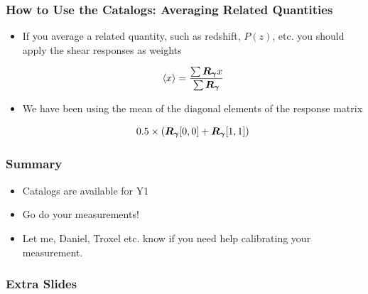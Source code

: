 \documentclass{beamer}
\newcommand{\mcalRg}{\mbox{\boldmath $R_\gamma$}}
\begin{document}
\frame
{
    \frametitle{How to Use the Catalogs: Averaging Related Quantities}
 
    \begin{itemize}

        \item If you average a related quantity, such as redshift, $P(z)$,
            etc. you should apply the shear responses as weights

            {\color{gold}
                \begin{align}
                    \langle x \rangle = \frac{\sum \mcalRg x}{\sum \mcalRg}
                \end{align}
            }

        \item We have been using the mean of the diagonal elements of the
            response matrix

            {\color{gold}
                \begin{align}
                    0.5 \times ( \mcalRg[0,0] + \mcalRg[1,1] )
                \end{align}
            }
    \end{itemize}
}


\frame
{
    \frametitle{Summary}
 
    \begin{itemize}

        \item Catalogs are available for Y1

        \item Go do your measurements!

        \item Let me, Daniel, Troxel etc. know if you need help calibrating
            your measurement.


    \end{itemize}
}







\frame
{
    \frametitle{Extra Slides}
}
\end{document}
